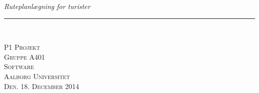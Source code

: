 \thispagestyle{empty}
\begin{flushright}
\vspace{3cm}

\phantom{hul}

\phantom{hul}

\phantom{hul}

\textsl{\Huge Ruteplanlægning for turister} \\ \vspace{1cm}

\rule{13cm}{3mm} \\ \vspace{1.5cm}
\vspace{1cm}

\vspace{12.5cm}

\vspace{2cm} 
\textsc{\Large P1 Projekt \\
Gruppe A401 \\
Software\\
Aalborg Universitet\\
Den. 18. December 2014\\}
\end{flushright}
